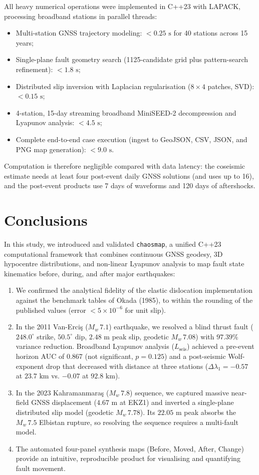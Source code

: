 \documentclass[11pt,a4paper]{article}
\begin{document}
All heavy numerical operations were implemented in C++23 with LAPACK, processing broadband stations in parallel threads:
\begin{itemize}
    \item Multi-station GNSS trajectory modeling: $<0.25\text{ s}$ for 40 stations across 15 years;
    \item Single-plane fault geometry search (1125-candidate grid plus pattern-search refinement): $<1.8\text{ s}$;
    \item Distributed slip inversion with Laplacian regularisation ($8 \times 4$ patches, SVD): $<0.15\text{ s}$;
    \item 4-station, 15-day streaming broadband MiniSEED-2 decompression and Lyapunov analysis: $<4.5\text{ s}$;
    \item Complete end-to-end case execution (ingest to GeoJSON, CSV, JSON, and PNG map generation): $<9.0\text{ s}$.
\end{itemize}
Computation is therefore negligible compared with data latency: the coseismic estimate needs at least four post-event daily GNSS solutions (and uses up to 16), and the post-event products use 7 days of waveforms and 120 days of aftershocks.

\section{Conclusions}
In this study, we introduced and validated \texttt{chaosmap}, a unified C++23 computational framework that combines continuous GNSS geodesy, 3D hypocentre distributions, and non-linear Lyapunov analysis to map fault state kinematics before, during, and after major earthquakes:
\begin{enumerate}
    \item We confirmed the analytical fidelity of the elastic dislocation implementation against the benchmark tables of Okada (1985), to within the rounding of the published values (error $<5\times 10^{-6}$ for unit slip).
    \item In the 2011 Van-Erci\c{s} ($M_w\,7.1$) earthquake, we resolved a blind thrust fault ($248.0^\circ$ strike, $50.5^\circ$ dip, $2.48\text{ m}$ peak slip, geodetic $M_w\,7.08$) with $97.39\%$ variance reduction. Broadband Lyapunov analysis ($L_{\text{seis}}$) achieved a pre-event horizon AUC of $0.867$ (not significant, $p = 0.125$) and a post-seismic Wolf-exponent drop that decreased with distance at three stations ($\Delta \lambda_1 = -0.57$ at $23.7\text{ km}$ vs. $-0.07$ at $92.8\text{ km}$).
    \item In the 2023 Kahramanmara\c{s} ($M_w\,7.8$) sequence, we captured massive near-field GNSS displacement ($4.67\text{ m}$ at EKZ1) and inverted a single-plane distributed slip model (geodetic $M_w\,7.78$). Its $22.05\text{ m}$ peak absorbs the $M_w\,7.5$ Elbistan rupture, so resolving the sequence requires a multi-fault model.
    \item The automated four-panel synthesis maps (Before, Moved, After, Change) provide an intuitive, reproducible product for visualising and quantifying fault movement.
\end{enumerate}
\end{document}

